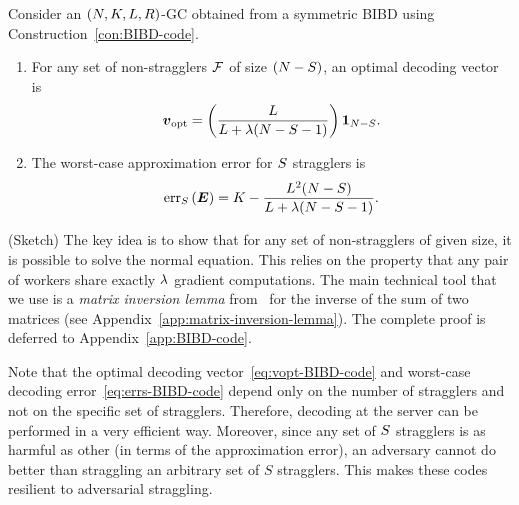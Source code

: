 \documentclass[conference,letterpaper]{IEEEtran}
\begin{document}
\begin{theorem}
\label{thm:BIBD-code}
Consider an $(N,K,L,R)$-GC %
obtained from a symmetric BIBD using Construction~\ref{con:BIBD-code}. 
\begin{enumerate}
    \item For any set of non-stragglers $\mathcal{F}$ of size $(N - S)$, an optimal decoding vector is 
\begin{equation}
    \label{eq:vopt-BIBD-code}
    \boldsymbol{v}_{\mathrm{opt}} = \left(\frac{L}{L + \lambda(N - S - 1)}\right)\boldsymbol{1}_{N-S}.
\end{equation}
    \item The worst-case approximation error for $S$ stragglers is 
\begin{equation}
    \label{eq:errs-BIBD-code}
    \mathrm{err}_{S}\left(\boldsymbol{E}\right) = K - \frac{L^2(N - S)}{L + \lambda(N - S - 1)}.
\end{equation}
\end{enumerate} 
\end{theorem}
\begin{IEEEproof}
(Sketch) %
The key idea is to show that for any set of non-stragglers of given size, it is possible to solve the normal equation. This relies on the property that any pair of workers share exactly $\lambda$ gradient computations. The main technical tool that we use is a {\it matrix inversion lemma} from~\cite{Miller:81:matrix-inversion} for the inverse of the sum of two matrices (see Appendix~\ref{app:matrix-inversion-lemma}). The complete proof is deferred to Appendix~\ref{app:BIBD-code}.
\end{IEEEproof}

\begin{remark}
\label{rem:symmetric-BIBD-code-adversarial}
{
Note that the optimal decoding vector~\eqref{eq:vopt-BIBD-code} and worst-case decoding error~\eqref{eq:errs-BIBD-code} depend only on the number of stragglers and not on the specific set of stragglers. Therefore, decoding at the server can be performed in a very efficient way. Moreover, since any set of $S$ stragglers is as harmful as other (in terms of the approximation error), an adversary cannot do better than straggling an arbitrary set of $S$ stragglers. This makes these codes resilient to adversarial straggling.
}
\end{remark}
\end{document}

